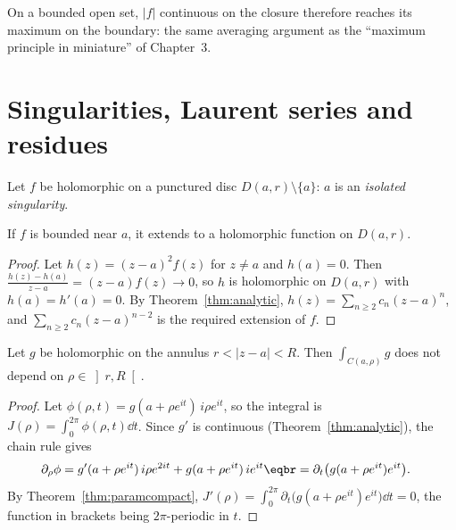 On a bounded open set, $|f|$ continuous on the closure therefore reaches its maximum on the boundary: the same averaging
argument as the ``maximum principle in miniature'' of Chapter~3.

\section{Singularities, Laurent series and residues}

Let $f$ be holomorphic on a punctured disc $D(a,r)\setminus\{a\}$: $a$ is an \emph{isolated singularity}.

\begin{theorem}\label{thm:removable}
If $f$ is bounded near $a$, it extends to a holomorphic function on $D(a,r)$.
\end{theorem}
\begin{proof}
Let $h(z)=(z-a)^2f(z)$ for $z\ne a$ and $h(a)=0$. Then $\frac{h(z)-h(a)}{z-a}=(z-a)f(z)\to0$, so $h$ is holomorphic on $D(a,r)$ with $h(a)=h'(a)=0$. By
Theorem~\ref{thm:analytic}, $h(z)=\sum_{n\ge2}c_n(z-a)^n$, and $\sum_{n\ge2}c_n(z-a)^{n-2}$ is the required extension of $f$.
\end{proof}

\begin{lemma}\label{lem:annulus}
Let $g$ be holomorphic on the annulus $r<|z-a|<R$. Then $\int_{C(a,\rho)}g$ does not depend on $\rho\in\left]r,R\right[$.
\end{lemma}
\begin{proof}
Let $\phi(\rho,t)=g(a+\rho e^{it})\,i\rho e^{it}$, so the integral is $J(\rho)=\int_0^{2\pi}\phi(\rho,t)\dd t$. Since $g'$ is continuous (Theorem~\ref{thm:analytic}), the chain
rule gives
\[
\begin{aligned}\partial_\rho\phi&=g'(a+\rho e^{it})\,i\rho e^{2it}+g(a+\rho e^{it})\,ie^{it}\eqbr=\partial_t\bigl(g(a+\rho e^{it})e^{it}\bigr).\end{aligned}
\]
By Theorem~\ref{thm:paramcompact}, $J'(\rho)=\int_0^{2\pi}\partial_t\bigl(g(a+\rho e^{it})e^{it}\bigr)\dd t=0$, the function in brackets being $2\pi$-periodic in $t$.
\end{proof}

